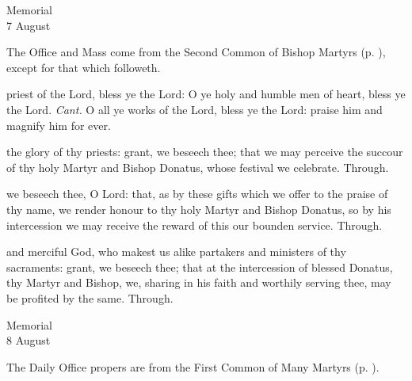 \begin{inhead}
    {Memorial\\
7 August}
\end{inhead}
\begin{rubric}
	The Office and Mass come from the Second Common of Bishop Martyrs (p. \pageref{CommonMartyrBishopII}), except for that which followeth.
\end{rubric}

\introit
{} priest of the Lord, bless ye the Lord: O ye holy and humble men of heart, bless ye the Lord. \textit{Cant.} O all ye works of the Lord, bless ye the Lord: praise him and magnify him for ever.

\collect
{} the glory of thy priests: grant, we beseech thee; that we may perceive the succour of thy holy Martyr and Bishop Donatus, whose festival we celebrate. Through.



\secret
{} we beseech thee, O Lord: that, as by these gifts which we offer to the praise of thy name, we render honour to thy holy Martyr and Bishop Donatus, so by his intercession we may receive the reward of this our bounden service. Through.


\postcommunion
{} and merciful God, who makest us alike partakers and ministers of thy sacraments: grant, we beseech thee; that at the intercession of blessed Donatus, thy Martyr and Bishop, we, sharing in his faith and worthily serving thee, may be profited by the same. Through.

\begin{inhead}
    {Memorial\\
8 August}
\end{inhead}
\begin{rubric}
	The Daily Office propers are from the First Common of Many Martyrs (p. \pageref{CommonMartyrsI}).
\end{rubric}

